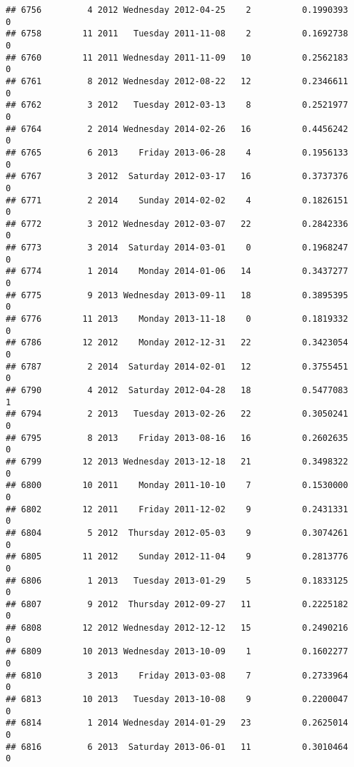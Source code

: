 \documentclass[
]{article}
\begin{document}
\begin{verbatim}
## 6756         4 2012 Wednesday 2012-04-25    2          0.1990393             0
## 6758        11 2011   Tuesday 2011-11-08    2          0.1692738             0
## 6760        11 2011 Wednesday 2011-11-09   10          0.2562183             0
## 6761         8 2012 Wednesday 2012-08-22   12          0.2346611             0
## 6762         3 2012   Tuesday 2012-03-13    8          0.2521977             0
## 6764         2 2014 Wednesday 2014-02-26   16          0.4456242             0
## 6765         6 2013    Friday 2013-06-28    4          0.1956133             0
## 6767         3 2012  Saturday 2012-03-17   16          0.3737376             0
## 6771         2 2014    Sunday 2014-02-02    4          0.1826151             0
## 6772         3 2012 Wednesday 2012-03-07   22          0.2842336             0
## 6773         3 2014  Saturday 2014-03-01    0          0.1968247             0
## 6774         1 2014    Monday 2014-01-06   14          0.3437277             0
## 6775         9 2013 Wednesday 2013-09-11   18          0.3895395             0
## 6776        11 2013    Monday 2013-11-18    0          0.1819332             0
## 6786        12 2012    Monday 2012-12-31   22          0.3423054             0
## 6787         2 2014  Saturday 2014-02-01   12          0.3755451             0
## 6790         4 2012  Saturday 2012-04-28   18          0.5477083             1
## 6794         2 2013   Tuesday 2013-02-26   22          0.3050241             0
## 6795         8 2013    Friday 2013-08-16   16          0.2602635             0
## 6799        12 2013 Wednesday 2013-12-18   21          0.3498322             0
## 6800        10 2011    Monday 2011-10-10    7          0.1530000             0
## 6802        12 2011    Friday 2011-12-02    9          0.2431331             0
## 6804         5 2012  Thursday 2012-05-03    9          0.3074261             0
## 6805        11 2012    Sunday 2012-11-04    9          0.2813776             0
## 6806         1 2013   Tuesday 2013-01-29    5          0.1833125             0
## 6807         9 2012  Thursday 2012-09-27   11          0.2225182             0
## 6808        12 2012 Wednesday 2012-12-12   15          0.2490216             0
## 6809        10 2013 Wednesday 2013-10-09    1          0.1602277             0
## 6810         3 2013    Friday 2013-03-08    7          0.2733964             0
## 6813        10 2013   Tuesday 2013-10-08    9          0.2200047             0
## 6814         1 2014 Wednesday 2014-01-29   23          0.2625014             0
## 6816         6 2013  Saturday 2013-06-01   11          0.3010464             0

\end{verbatim}
\end{document}
